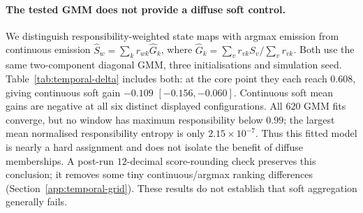 \documentclass[11pt]{article}
\begin{document}
\paragraph{The tested GMM does not provide a diffuse soft control.}
We distinguish responsibility-weighted state maps with argmax
emission from continuous emission
$\widehat S_w=\sum_k r_{wk}\widehat G_k$, where
$\widehat G_k=\sum_v r_{vk}S_v/\sum_v r_{vk}$. Both use the same two-component
diagonal GMM, three initialisations and simulation seed. Table~\ref{tab:temporal-delta}
includes both: at the core point they each reach $0.608$, giving continuous
soft gain $-0.109$ $[-0.156,-0.060]$. Continuous soft mean gains are negative
at all six distinct displayed configurations. All $620$ GMM fits converge, but
no window has maximum responsibility below $0.99$; the largest mean normalised
responsibility entropy is only $2.15\times10^{-7}$. Thus this fitted model is
nearly a hard assignment and does not isolate the benefit of diffuse memberships.
A post-run $12$-decimal score-rounding check preserves this conclusion; it removes
some tiny continuous/argmax ranking differences (Section~\ref{app:temporal-grid}).
These results do not establish that soft aggregation generally fails.

\begin{table}[!htbp]
\centering
\caption{Paired temporal gain over raw windows on the existing duration and length
scans (twenty seeds per cell). Raw is absolute within-edge temporal AUROC; all other score
columns are $\Delta_{\mathrm{temporal}}$. Gate counts concern gated hard.
Forced hard bypasses only that gate. GMM uses continuous responsibility emission;
oracle averages by true window labels, without refitting. The reference cell
appears once in each scan and is not an independent replication.}
\label{tab:temporal-grid}
\resizebox{\linewidth}{!}{}
\end{table}

\begin{table}[!htbp]
\centering
\caption{Three-condition two-state diagnostics, twenty seeds each at $h=300$.
Hard and Raw are within-edge temporal AUROCs. The identity uses the mean
per-seed product, not the product of marginal means. The $M=19$ row bypasses
the gate and evaluates the unchanged hard candidate on all seeds. Factors are
aligned by the same truth-overlap label matching used in the core diagnostic.}
\label{tab:grouping-factors}
\resizebox{\linewidth}{!}{}
\end{table}
\end{document}
